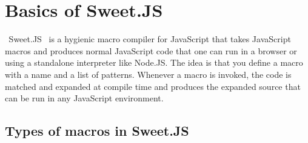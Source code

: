 \chapter{Basics of Sweet.JS}
\textcolor{white}{``}Sweet.JS~\cite{bib6} is a hygienic macro compiler for JavaScript that takes JavaScript macros and produces normal JavaScript code that one can run in a browser or using a standalone interpreter like Node.JS. The idea is that you define a macro with a name and a list of patterns. Whenever a macro is invoked, the code is matched and expanded at  compile time and produces the expanded source that can be run in any JavaScript environment. \textcolor{white}{''}
\section{Types of macros in Sweet.JS}
